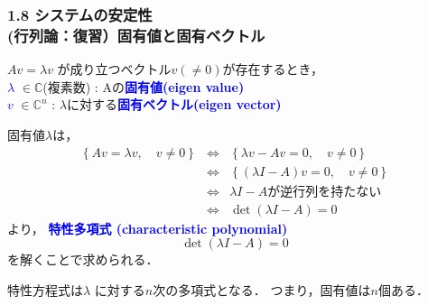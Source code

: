 \documentclass[10pt]{beamer}
\begin{document}
\begin{frame}[t]
\frametitle{1.8 システムの安定性 \\
(行列論：復習）固有値と固有ベクトル}
$A v = \lambda v$
が成り立つベクトル$v (\neq 0)$が存在するとき，\\
\textcolor{blue}{$\lambda$} $\in {\mathbb C}$(複素数) : Aの\textcolor{blue}{\bf {固有値}(eigen value)}\\
\textcolor{blue}{$v$} $\in {\mathbb C}^n$
 : $\lambda$に対する\textcolor{blue}{\bf {固有ベクトル}(eigen vector)}

固有値$\lambda$は，
\[
 \begin{array}{rcl}
  \left\{A v = \lambda v, \quad v \neq 0\right\}
   &\Leftrightarrow& \left\{\lambda v - Av = 0, \quad v \neq 0\right\} \\
   &\Leftrightarrow& \left\{(\lambda I - A)v = 0, \quad v \neq 0\right\} \\
  &\Leftrightarrow& \lambda I - A \text{が逆行列を持たない} \\
  &\Leftrightarrow& \operatorname{det}(\lambda I - A) = 0
 \end{array}
\]
より，
\textcolor{blue}{\bf {特性多項式} (characteristic polynomial)}
\begin{equation}
  \operatorname{det}(\lambda I - A) = 0
\end{equation}
を解くことで求められる．

特性方程式は$\lambda$ に対する$n$次の多項式となる．
つまり，固有値は$n$個ある．
\end{frame}
\end{document}
